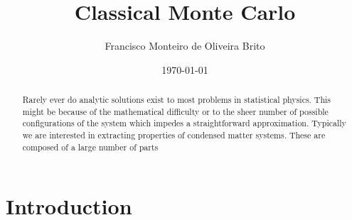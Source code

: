 \documentclass[10pt]{article}
\begin{document}
\title{Classical Monte Carlo}
\author{Francisco Monteiro de Oliveira Brito}
\date{\today}
\maketitle

\begin{abstract}
Rarely ever do analytic solutions exist to most problems in statistical physics. This might be because of the mathematical difficulty or to the sheer number of possible configurations of the system which impedes a straightforward approximation. Typically we are interested in extracting properties of condensed matter systems. These are composed of a large number of parts 
\end{abstract}

\section{Introduction}\paragraph{}
\end{document}
